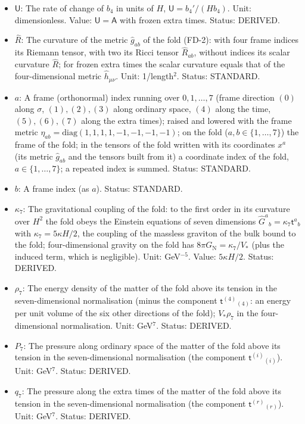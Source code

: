 \documentclass[
  10pt,
]{article}
\begin{document}
\begin{itemize}
  constant); the first-order equations of the fold hold for
  \(\mathsf{A}^2 \ll 1\); 1 at the author's vacuum, which is not a
  solution of UM-4. Status: DERIVED.
\item
  \(\mathsf{U}\): The rate of change of \(b_4\) in units of \(H\),
  \(\mathsf{U} = b_4'/(Hb_4)\). Unit: dimensionless. Value:
  \(\mathsf{U} = \mathsf{A}\) with frozen extra times. Status: DERIVED.
\item
  \(\hat R\): The curvature of the metric \(\hat g_{ab}\) of the fold
  (FD-2): with four frame indices its Riemann tensor, with two its Ricci
  tensor \(\hat R_{ab}\), without indices its scalar curvature
  \(\hat R\); for frozen extra times the scalar curvature equals that of
  the four-dimensional metric \(\hat h_{\mu\nu}\). Unit: 1/length\(^2\).
  Status: STANDARD.
\item
  \(a\): A frame (orthonormal) index running over \(0, 1, \dots, 7\)
  (frame direction \((0)\) along \(\sigma\), \((1), (2), (3)\) along
  ordinary space, \((4)\) along the time, \((5), (6), (7)\) along the
  extra times); raised and lowered with the frame metric
  \(\eta_{ab} = \mathrm{diag}(1, 1, 1, 1, -1, -1, -1, -1)\); on the fold
  (\(a, b \in \{1, \dots, 7\}\)) the frame of the fold; in the tensors
  of the fold written with its coordinates \(x^a\) (its metric
  \(\hat g_{ab}\) and the tensors built from it) a coordinate index of
  the fold, \(a \in \{1, \dots, 7\}\); a repeated index is summed.
  Status: STANDARD.
\item
  \(b\): A frame index (as \(a\)). Status: STANDARD.
\item
  \(\kappa_7\): The gravitational coupling of the fold: to the first
  order in its curvature over \(H^2\) the fold obeys the Einstein
  equations of seven dimensions
  \(\hat G^a{}_b = \kappa_7\mathsf{t}^a{}_b\) with
  \(\kappa_7 = 5\kappa H/2\), the coupling of the massless graviton of
  the bulk bound to the fold; four-dimensional gravity on the fold has
  \(8\pi G_{\mathrm{N}} = \kappa_7/V_*\) (plus the induced term, which
  is negligible). Unit: GeV\(^{-5}\). Value: \(5\kappa H/2\). Status:
  DERIVED.
\item
  \(\rho_7\): The energy density of the matter of the fold above its
  tension in the seven-dimensional normalisation (minus the component
  \(\mathsf{t}^{(4)}{}_{(4)}\): an energy per unit volume of the six
  other directions of the fold); \(V_*\rho_7\) in the four-dimensional
  normalisation. Unit: GeV\(^7\). Status: DERIVED.
\item
  \(P_7\): The pressure along ordinary space of the matter of the fold
  above its tension in the seven-dimensional normalisation (the
  component \(\mathsf{t}^{(i)}{}_{(i)}\)). Unit: GeV\(^7\). Status:
  DERIVED.
\item
  \(q_7\): The pressure along the extra times of the matter of the fold
  above its tension in the seven-dimensional normalisation (the
  component \(\mathsf{t}^{(r)}{}_{(r)}\)). Unit: GeV\(^7\). Status:
  DERIVED.
\end{itemize}
\end{document}
